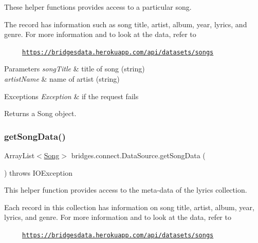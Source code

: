 These helper functions provides access to a particular song.

The record has information such as song title, artist, album, year, lyrics, and genre. For more information and to look at the data, refer to 

~~~~~\href{https://bridgesdata.herokuapp.com/api/datasets/songs}{\tt https\+://bridgesdata.\+herokuapp.\+com/api/datasets/songs} 


\begin{DoxyParams}{Parameters}
{\em song\+Title} & title of song (string) \\
\hline
{\em artist\+Name} & name of artist (string) \\
\hline
\end{DoxyParams}

\begin{DoxyExceptions}{Exceptions}
{\em Exception} & if the request fails\\
\hline
\end{DoxyExceptions}
\begin{DoxyReturn}{Returns}
a Song object. 
\end{DoxyReturn}
\mbox{\label{classbridges_1_1connect_1_1_data_source_aeccb689aeacc094b0621ab5564849fa6}} 
\subsubsection{\texorpdfstring{get\+Song\+Data()}{getSongData()}}
{\footnotesize\ttfamily Array\+List$<$\hyperlink{classbridges_1_1data__src__dependent_1_1_song}{Song}$>$ bridges.\+connect.\+Data\+Source.\+get\+Song\+Data (\begin{DoxyParamCaption}{ }\end{DoxyParamCaption}) throws I\+O\+Exception}

This helper function provides access to the meta-\/data of the lyrics collection.

Each record in this collection has information on song title, artist, album, year, lyrics, and genre. For more information and to look at the data, refer to 

~~~~~\href{https://bridgesdata.herokuapp.com/api/datasets/songs}{\tt https\+://bridgesdata.\+herokuapp.\+com/api/datasets/songs} 


